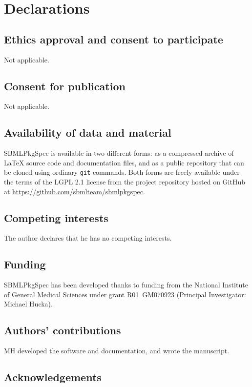 \documentclass{bmcart}
\newcommand{\sbmlpkg}{SBMLPkgSpec}
\newcommand{\githuburl}{https://github.com/sbmlteam/sbmlpkgspec}
\begin{document}
\section*{Declarations}

\subsection*{Ethics approval and consent to participate}

Not applicable.

\subsection*{Consent for publication}

Not applicable.

\subsection*{Availability of data and material}

\sbmlpkg{} is available in two different forms: as a compressed archive of LaTeX source code and documentation files, and as a public repository that can be cloned using ordinary \texttt{git} commands. Both forms are freely available under the terms of the LGPL 2.1 license from the project repository hosted on GitHub at \url{\githuburl}.

\subsection*{Competing interests}

The author declares that he has no competing interests.

\subsection*{Funding}

\sbmlpkg{} has been developed thanks to funding from the National Institute of General Medical Sciences under grant R01~GM070923 (Principal Investigator: Michael Hucka).

\subsection*{Authors' contributions}

MH developed the software and documentation, and wrote the manuscript.

\subsection*{Acknowledgements}
\end{document}

